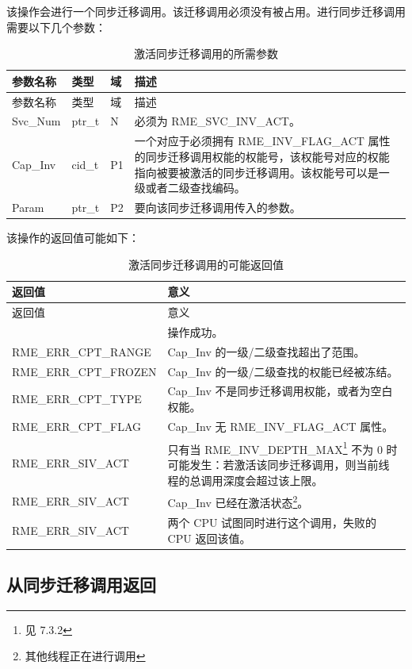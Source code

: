 该操作会进行一个同步迁移调用。该迁移调用必须没有被占用。进行同步迁移调用需要以下几个参数：

\begin{xltabular}{\textwidth}{@{}>{\hsize\raggedright\arraybackslash}X>{\hsize\raggedright\arraybackslash}X>{\hsize\raggedright\arraybackslash}X>{\hsize\raggedright\arraybackslash}X@{}}
\caption{激活同步迁移调用的所需参数}\label{tab:5-10-activate-sync-invocation-parameters}\\
\toprule
参数名称 & 类型 & 域 & 描述\tabularnewline
\endfirsthead
\toprule
参数名称 & 类型 & 域 & 描述\tabularnewline
\midrule
\endhead
\bottomrule
\endlastfoot
Svc\_Num & ptr\_t & N & 必须为 RME\_SVC\_INV\_ACT。\tabularnewline
Cap\_Inv & cid\_t & P1 &
一个对应于必须拥有 RME\_INV\_FLAG\_ACT 属性的同步迁移调用权能的权能号，该权能号对应的权能指向被要被激活的同步迁移调用。该权能号可以是一级或者二级查找编码。\tabularnewline
Param & ptr\_t & P2 & 要向该同步迁移调用传入的参数。\tabularnewline
\end{xltabular}

该操作的返回值可能如下：

\begin{xltabular}{\textwidth}{@{}>{\hsize\raggedright\arraybackslash}X>{\hsize\raggedright\arraybackslash}X@{}}
\caption{激活同步迁移调用的可能返回值}\label{tab:5-11-activate-sync-invocation-return-values}\\
\toprule
返回值 & 意义\tabularnewline
\endfirsthead
\toprule
返回值 & 意义\tabularnewline
\midrule
\endhead
\bottomrule
{} & 操作成功。\tabularnewline
    RME\_ERR\_CPT\_RANGE & Cap\_Inv 的一级/二级查找超出了范围。\tabularnewline
    RME\_ERR\_CPT\_FROZEN & Cap\_Inv 的一级/二级查找的权能已经被冻结。\tabularnewline
    RME\_ERR\_CPT\_TYPE & Cap\_Inv 不是同步迁移调用权能，或者为空白权能。\tabularnewline
    RME\_ERR\_CPT\_FLAG & Cap\_Inv 无 RME\_INV\_FLAG\_ACT 属性。\tabularnewline
    RME\_ERR\_SIV\_ACT & 只有当 RME\_INV\_DEPTH\_MAX\footnote{见 7.3.2} 不为 0 时可能发生：若激活该同步迁移调用，则当前线程的总调用深度会超过该上限。\tabularnewline
    RME\_ERR\_SIV\_ACT & Cap\_Inv 已经在激活状态\footnote{其他线程正在进行调用}。\tabularnewline
    RME\_ERR\_SIV\_ACT & 两个 CPU 试图同时进行这个调用，失败的 CPU 返回该值。\tabularnewline
\end{xltabular}

\subsection{从同步迁移调用返回}\label{subsec:5-return-from-sync-invocation}

